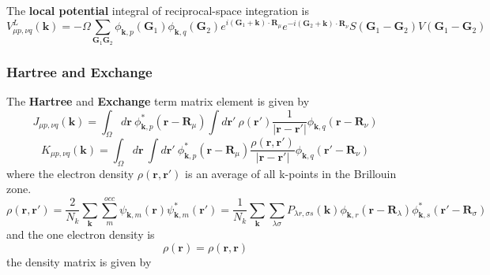 \documentclass{article}
\begin{document}
            The \textbf{local potential} integral of reciprocal-space integration is
            \begin{equation}
                V_{\mu p,\nu q}^L(\textbf{k}) = -\Omega\sum_{\textbf{G}_1\textbf{G}_2}\phi_{\textbf{k},p}(\textbf{G}_1)\phi_{\textbf{k},q}(\textbf{G}_2)e^{i(\textbf{G}_1+\textbf{k})\cdot\textbf{R}_{\mu}}e^{-i(\textbf{G}_2+\textbf{k})\cdot\textbf{R}_{\nu}}S(\textbf{G}_1-\textbf{G}_2)V(\textbf{G}_1-\textbf{G}_2)
            \end{equation}         
            
        \subsubsection{Hartree and Exchange}
            The \textbf{Hartree} and \textbf{Exchange} term matrix element is given by
            \begin{equation}
                J_{\mu p,\nu q}(\textbf{k}) = \int_{\Omega}d\textbf{r}\ \phi_{\textbf{k},p}^*(\textbf{r}-\textbf{R}_{\mu})\int d\textbf{r}'\ \rho(\textbf{r}')\frac{1}{\left|\textbf{r}-\textbf{r}'\right|}\phi_{\textbf{k},q}(\textbf{r}-\textbf{R}_{\nu})\label{hartree}
            \end{equation}
            \begin{equation}
                K_{\mu p,\nu q}(\textbf{k}) = \int_{\Omega}d\textbf{r}\ \int d\textbf{r}'\ \phi_{\textbf{k},p}^*(\textbf{r}-\textbf{R}_{\mu})\frac{\rho(\textbf{r},\textbf{r}')}{\left|\textbf{r}-\textbf{r}'\right|}\phi_{\textbf{k},q}(\textbf{r}'-\textbf{R}_{\nu})\label{exchange}
            \end{equation}
            where the electron density $\rho(\textbf{r},\textbf{r}')$ is an average of all k-points in the Brillouin zone.
            \begin{equation}
                \rho(\textbf{r},\textbf{r}') = \frac{2}{N_k}\sum_{\textbf{k}}\sum_m^{occ}\psi_{\textbf{k},m}(\textbf{r})\psi_{\textbf{k},m}^*(\textbf{r}')
                = \frac{1}{N_k}\sum_{\textbf{k}}\sum_{\lambda\sigma}P_{\lambda r,\sigma s}(\textbf{k})\phi_{\textbf{k},r}(\textbf{r}-\textbf{R}_{\lambda})\phi_{\textbf{k},s}^*(\textbf{r}'-\textbf{R}_{\sigma})
            \end{equation}
            and the one electron density is
            \begin{equation}
                \rho(\textbf{r}) = \rho(\textbf{r},\textbf{r})
            \end{equation}
            the density matrix is given by
\end{document}
